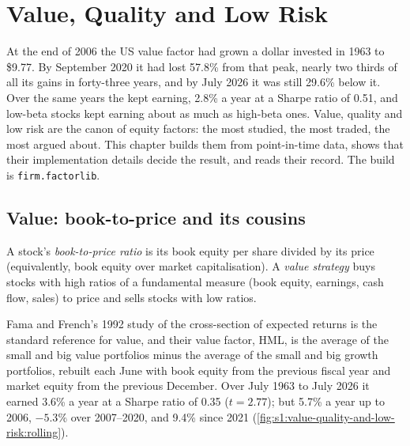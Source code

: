 \chapter{Value, Quality and Low Risk}\label{ch:s1:value-quality-and-low-risk}

At the end of 2006 the US value factor had grown a dollar invested in 1963 to \$9.77. By September 2020 it had lost 57.8\% from that peak, nearly two
thirds of all its gains in forty-three years, and by July 2026 it was still 29.6\% below it. Over the same years the  kept earning, 2.8\% a
year at a Sharpe ratio of 0.51, and low-beta stocks kept earning about as much as high-beta ones. Value, quality and low risk are the canon of equity
factors: the most studied, the most traded, the most argued about. This chapter builds them from point-in-time data, shows that their implementation details
decide the result, and reads their record. The build is \texttt{firm.factorlib}.

\section{Value: book-to-price and its cousins}

\begin{definition}\label{def:s1:value-quality-and-low-risk:value}
A stock's \emph{book-to-price ratio} is its book equity per share divided by its price (equivalently, book equity over market
capitalisation). A \emph{value strategy} buys stocks with high ratios of a fundamental measure (book equity, earnings, cash flow, sales)
to price and sells stocks with low ratios.
\end{definition}

Fama and French's 1992 study of the cross-section of expected returns is the standard reference for value, and their value factor, HML, is the average of the small and big value portfolios minus the average of the small and big growth portfolios, rebuilt each June with
book equity from the previous fiscal year and market equity from the previous December. Over July 1963 to July 2026 it earned 3.6\% a year at a Sharpe ratio
of 0.35 ($t = 2.77$); but 5.7\% a year up to 2006, $-5.3\%$ over 2007--2020, and 9.4\% since 2021 (\cref{fig:s1:value-quality-and-low-risk:rolling}).

